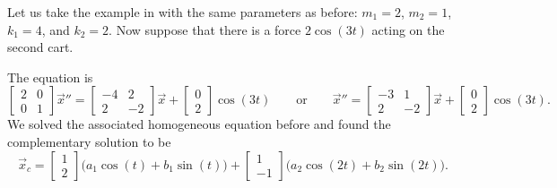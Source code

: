 \begin{example}
Let us take the example in  with
the same parameters as before:
$m_1 = 2$, $m_2 = 1$, $k_1 = 4$, and $k_2 = 2$.  Now suppose that
there is a force $2 \cos (3t)$ acting on the second cart.

The equation is
\begin{equation*}
\begin{bmatrix}
2 & 0 \\
0 & 1
\end{bmatrix}
{\vec{x}}'' =
\begin{bmatrix}
-4 & 2 \\
2 & -2
\end{bmatrix}
\vec{x} 
+ 
\begin{bmatrix}
0 \\ 2
\end{bmatrix}
\cos (3 t) \qquad \text{or} \qquad
{\vec{x}}'' =
\begin{bmatrix}
-3 & 1 \\
2 & -2
\end{bmatrix}
\vec{x} 
+ 
\begin{bmatrix}
0 \\ 2
\end{bmatrix}
\cos (3 t) .
\end{equation*}
We solved the associated homogeneous equation before and found the
complementary solution to be
\begin{equation*}
\vec{x}_c =
\begin{bmatrix} 1 \\ 2 \end{bmatrix}
\bigl( a_1 \cos (t) + b_1 \sin (t) \bigr)
+
\begin{bmatrix} 1 \\ -1 \end{bmatrix}
\bigl( a_2 \cos (2t) + b_2 \sin (2t) \bigr) .
\end{equation*}


\end{example}
